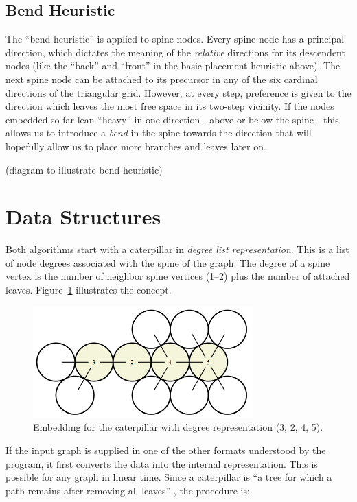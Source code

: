 \documentclass[draft,final]{vutinfth} %
\begin{document}
\subsection{Bend Heuristic}

The ``bend heuristic'' is applied to spine nodes.
Every spine node has a principal direction, which dictates the meaning of the \emph{relative} directions for its descendent nodes (like the ``back'' and ``front'' in the basic placement heuristic above).
The next spine node can be attached to its precursor in any of the six cardinal directions of the triangular grid. However, at every step, preference is given to the direction which leaves the most free space in its two-step vicinity.
If the nodes embedded so far lean ``heavy'' in one direction - above or below the spine - this allows us to introduce a \emph{bend} in the spine towards the direction that will hopefully allow us to place more branches and leaves later on.

(diagram to illustrate bend heuristic)



\section{Data Structures}

Both algorithms start with a caterpillar in \emph{degree list representation}.
This is a list of node degrees associated with the spine of the graph.
The degree of a spine vertex is the number of neighbor spine vertices (1--2) plus the number of attached leaves. Figure~\ref{fig:degree_repr} illustrates the concept.

\begin{figure}
    \centering
    \includegraphics[width=240pt]{graphics/degree_repr.png}
    \caption{Embedding for the caterpillar with degree representation (3, 2, 4, 5).}
    \label{fig:degree_repr}
\end{figure}

If the input graph is supplied in one of the other formats understood by the program, it first converts the data into the internal representation. This is possible for any graph in linear time.
Since a caterpillar is ``a tree for which a path remains after removing all leaves'' \cite{Klemz2015}, the procedure is:
\end{document}
